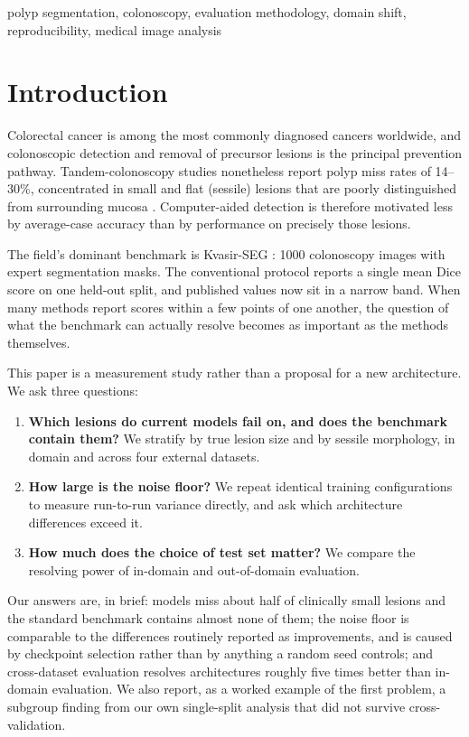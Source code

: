 \documentclass[journal]{IEEEtran}
\begin{document}
\begin{IEEEkeywords}
polyp segmentation, colonoscopy, evaluation
methodology, domain shift, reproducibility, medical image analysis
\end{IEEEkeywords}

\section{Introduction}

Colorectal cancer is among the most commonly diagnosed cancers worldwide, and
colonoscopic detection and removal of precursor lesions is the principal
prevention pathway. Tandem-colonoscopy studies nonetheless report polyp miss
rates of 14--30\%, concentrated in small and flat (sessile) lesions that are
poorly distinguished from surrounding mucosa \cite{leufkens2012,vanrijn2006}.
Computer-aided detection is therefore motivated less by average-case accuracy
than by performance on precisely those lesions.

The field's dominant benchmark is Kvasir-SEG \cite{jha2020kvasirseg}: 1000
colonoscopy images with expert segmentation masks. The conventional protocol
reports a single mean Dice score on one held-out split, and published values
now sit in a narrow band. When many methods report scores within a few points
of one another, the question of what the benchmark can actually resolve
becomes as important as the methods themselves.

This paper is a measurement study rather than a proposal for a new
architecture. We ask three questions:

\begin{enumerate}
\item \textbf{Which lesions do current models fail on, and does the benchmark
contain them?} We stratify by true lesion size and by sessile morphology, in
domain and across four external datasets.
\item \textbf{How large is the noise floor?} We repeat identical training
configurations to measure run-to-run variance directly, and ask which
architecture differences exceed it.
\item \textbf{How much does the choice of test set matter?} We compare the
resolving power of in-domain and out-of-domain evaluation.
\end{enumerate}

Our answers are, in brief: models miss about half of clinically small lesions
and the standard benchmark contains almost none of them; the noise floor is
comparable to the differences routinely reported as improvements, and is
caused by checkpoint selection rather than by anything a random seed
controls; and cross-dataset evaluation resolves architectures roughly five
times better than in-domain evaluation. We also report, as a worked example
of the first problem, a subgroup finding from our own single-split analysis
that did not survive cross-validation.
\end{document}
